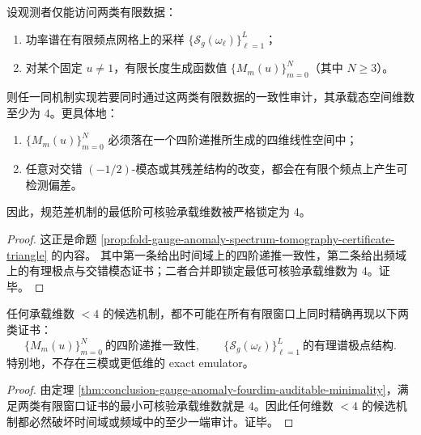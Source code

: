 \begin{theorem}\label{thm:conclusion-gauge-anomaly-fourdim-auditable-minimality}
设观测者仅能访问两类有限数据：
\begin{enumerate}
  \item 功率谱在有限频点网格上的采样 \(\{\mathcal S_g(\omega_\ell)\}_{\ell=1}^{L}\)；
  \item 对某个固定 \(u\neq 1\)，有限长度生成函数值 \(\{M_m(u)\}_{m=0}^{N}\)（其中 \(N\ge 3\)）。
\end{enumerate}
则任一同机制实现若要同时通过这两类有限数据的一致性审计，其承载态空间维数至少为 \(4\)。更具体地：
\begin{enumerate}
  \item \(\{M_m(u)\}_{m=0}^{N}\) 必须落在一个四阶递推所生成的四维线性空间中；
  \item 任意对交错 \(({-1/2})\)-模态或其残差结构的改变，都会在有限个频点上产生可检测偏差。
\end{enumerate}
因此，规范差机制的最低阶可核验承载维数被严格锁定为 \(4\)。
\end{theorem}
\begin{proof}
这正是命题 \ref{prop:fold-gauge-anomaly-spectrum-tomography-certificate-triangle} 的内容。
其中第一条给出时间域上的四阶递推一致性，第二条给出频域上的有理极点与交错模态证书；二者合并即锁定最低可核验承载维数为 \(4\)。证毕。
\end{proof}

\begin{corollary}\label{cor:conclusion-gauge-anomaly-no-three-mode-emulator}
任何承载维数 \(<4\) 的候选机制，都不可能在所有有限窗口上同时精确再现以下两类证书：
\[
\{M_m(u)\}_{m=0}^{N}\ \text{的四阶递推一致性},
\qquad
\{\mathcal S_g(\omega_\ell)\}_{\ell=1}^{L}\ \text{的有理谱极点结构}.
\]
特别地，不存在三模或更低维的 exact emulator。
\end{corollary}
\begin{proof}
由定理 \ref{thm:conclusion-gauge-anomaly-fourdim-auditable-minimality}，满足两类有限窗口证书的最小可核验承载维数就是 \(4\)。因此任何维数 \(<4\) 的候选机制都必然破坏时间域或频域中的至少一端审计。证毕。
\end{proof}


